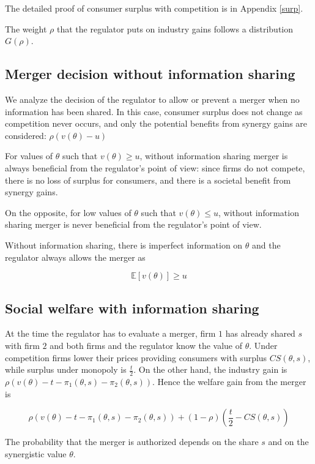 \documentclass[a4paper,leqno]{article}%
\newcommand{\E}{\mathbb E}
\renewcommand{\t}{\theta}
\begin{document}
The detailed proof of consumer surplus with competition is in Appendix \ref{surp}.

The weight $\rho$ that the regulator puts on industry gains follows a distribution $G(\rho)$.


\subsection{Merger decision without information sharing}

We analyze the decision of the regulator to allow or prevent a merger when no information has been shared. In this case, consumer surplus does not change as competition never occurs, and only the potential benefits from synergy gains are considered: $\rho (v(\t)-u)$

For values of $\t$ such that $v(\t)\geq u$, without information sharing merger is always beneficial from the regulator's point of view: since firms do not compete, there is no loss of surplus for consumers, and there is a societal benefit from synergy gains.

On the opposite, for low values of $\t$ such that $v(\t)\leq u$, without information sharing merger is never beneficial from the regulator's point of view.

Without information sharing, there is imperfect information on $\t$ and the regulator always allows the merger as 

\[
\E[v(\t)]\geq u
\]

\medskip

\subsection{Social welfare with information sharing}

\medskip

At the time the regulator has to evaluate a merger, firm $1$ has already shared $s$ with firm $2$ and both firms and the regulator know the value of $\t$. Under competition firms lower their prices providing consumers with surplus $CS(\t,s)$, while surplus under monopoly is $\frac{t}{2}$. On the other hand, the industry gain is $\rho (v(\t)-t-\pi_1(\t,s)-\pi_2(\t,s))$. Hence the welfare gain from the merger is



\[
\rho(v(\t)-t-\pi_1(\t,s)-\pi_2(\t,s))+(1-\rho)(\frac{t}{2}-CS(\t,s))
\]




The probability that the merger is authorized depends on the share $s$ and on the synergistic value $\t$. 
\end{document}
